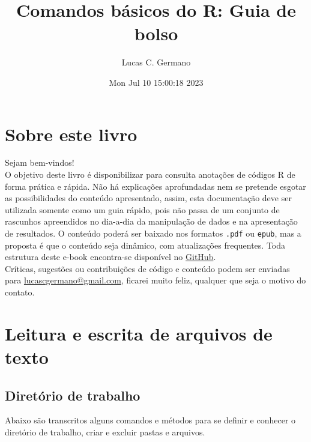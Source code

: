 \documentclass[
]{book}
\title{Comandos básicos do R: Guia de bolso}
\author{Lucas C. Germano}
\date{Mon Jul 10 15:00:18 2023}
\theoremstyle{definition}
\theoremstyle{definition}
\theoremstyle{definition}
\theoremstyle{definition}
\theoremstyle{remark}
\begin{document}
\maketitle

{
\setcounter{tocdepth}{1}
\tableofcontents
}
\hypertarget{sobre-este-livro}{%
\chapter*{Sobre este livro}\label{sobre-este-livro}}

Sejam bem-vindos!\\
O objetivo deste livro é disponibilizar para consulta anotações de códigos R de forma prática e rápida. Não há explicações aprofundadas nem se pretende esgotar as possibilidades do conteúdo apresentado, assim, esta documentação deve ser utilizada somente como um guia rápido, pois não passa de um conjunto de rascunhos apreendidos no dia-a-dia da manipulação de dados e na apresentação de resultados. O conteúdo poderá ser baixado nos formatos \texttt{.pdf} ou \texttt{epub}, mas a proposta é que o conteúdo seja dinâmico, com atualizações frequentes. Toda estrutura deste e-book encontra-se disponível no \href{https://github.com/lucascgmermano/guia_de_bolso.git}{GitHub}.\\
Críticas, sugestões ou contribuições de código e conteúdo podem ser enviadas para \url{lucascgermano@gmail.com}, ficarei muito feliz, qualquer que seja o motivo do contato.

\hypertarget{leitura-e-escrita-de-arquivos-de-texto}{%
\chapter{Leitura e escrita de arquivos de texto}\label{leitura-e-escrita-de-arquivos-de-texto}}

\hypertarget{diretuxf3rio-de-trabalho}{%
\section{Diretório de trabalho}\label{diretuxf3rio-de-trabalho}}

Abaixo são transcritos alguns comandos e métodos para se definir e conhecer o diretório de trabalho, criar e excluir pastas e arquivos.
\end{document}

